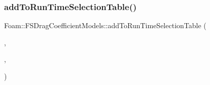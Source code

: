 \mbox{\label{namespaceFoam_1_1FSDragCoefficientModels_a3c92ac007efbade3f6e0ade049dd508d}} 
\subsubsection{\texorpdfstring{add\+To\+Run\+Time\+Selection\+Table()}{addToRunTimeSelectionTable()}\hspace{0.1cm}{\footnotesize\ttfamily [7/7]}}
{\footnotesize\ttfamily Foam\+::\+F\+S\+Drag\+Coefficient\+Models\+::add\+To\+Run\+Time\+Selection\+Table (\begin{DoxyParamCaption}\item[{\hyperlink{classFoam_1_1FSDragCoefficientModel}{F\+S\+Drag\+Coefficient\+Model}}]{,  }\item[{\hyperlink{classFoam_1_1FSDragCoefficientModels_1_1ReynoldsPower}{Reynolds\+Power}}]{,  }\item[{F\+S\+Drag\+Coefficient\+Models}]{ }\end{DoxyParamCaption})}

